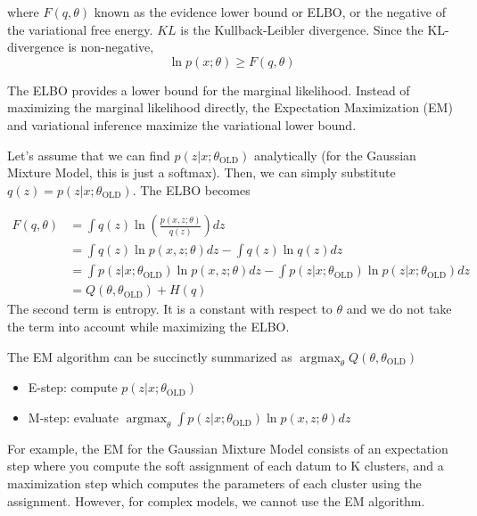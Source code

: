 \documentclass{article}
\DeclareMathOperator*{\argmax}{argmax}
\begin{document}
where $F(q,\theta)$ known as the evidence lower bound or ELBO, or the negative of the variational free energy. $KL$ is the Kullback-Leibler divergence. Since the KL-divergence is non-negative,
\[ \ln p(x;\theta) \geq F(q,\theta) \]

The ELBO provides a lower bound for the marginal likelihood. Instead of maximizing the marginal likelihood directly, the Expectation Maximization (EM) and variational inference maximize the variational lower bound.

Let's assume that we can find $p(z|x; \theta_\text{OLD})$ analytically (for the Gaussian Mixture Model, this is just a softmax). Then, we can simply substitute $q(z)=p(z|x;\theta_\text{OLD})$. The ELBO becomes

\begin{align}
F(q,\theta) &= \int q(z) \ln \left( \frac{p(x,z; \theta)}{q(z)} \right) dz \nonumber \\
&= \int q(z) \ln p(x,z; \theta)  dz - \int q(z) \ln q(z) dz  \nonumber \\
&= \int p(z|x;\theta_\text{OLD}) \ln p(x,z; \theta)  dz - \int p(z|x;\theta_\text{OLD}) \ln p(z|x;\theta_\text{OLD}) dz  \nonumber  \\
&= Q(\theta, \theta_\text{OLD}) + H(q)
\end{align}
The second term is entropy. It is a constant with respect to $\theta$ and we do not take the term into account while maximizing the ELBO.

The EM algorithm can be succinctly summarized as $\argmax_{\theta} Q(\theta, \theta_\text{OLD})$
\begin{itemize}
\item E-step: compute $p(z|x;\theta_\text{OLD})$
\item M-step: evaluate $\argmax_{\theta} \int p(z|x;\theta_\text{OLD}) \ln p(x,z; \theta)  dz$
\end{itemize}

For example, the EM for the Gaussian Mixture Model consists of an expectation step where you compute the soft assignment of each datum to K clusters, and a maximization step which computes the parameters of each cluster using the assignment. However, for complex models, we cannot use the EM algorithm.
\end{document}

